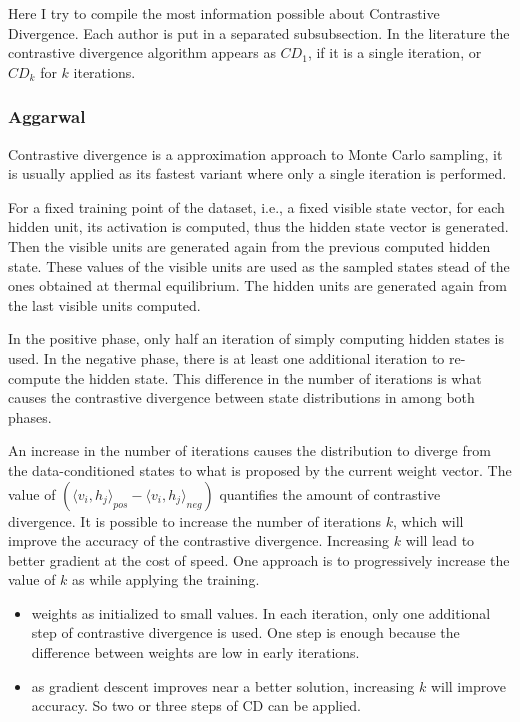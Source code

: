 Here I try to compile the most information possible about Contrastive Divergence.
Each author is put in a separated subsubsection.
In the literature the contrastive divergence algorithm appears as $CD_{1}$, if it is a single iteration, or $CD_{k}$ for $k$ iterations.

\subsubsection{Aggarwal}

Contrastive divergence is a approximation approach to Monte Carlo sampling, it is usually applied as its fastest variant where only a single iteration is performed.

For a fixed training point of the dataset, i.e., a fixed visible state vector, for each hidden unit, its activation is computed, thus the hidden state vector is generated.
Then the visible units are generated again from the previous computed hidden state.
These values of the visible units are used as the sampled states stead of the ones obtained at thermal equilibrium. 
The hidden units are generated again from the last visible units computed. 

In the positive phase, only half an iteration of simply computing hidden states is used.
In the negative phase, there is at least one additional iteration to re-compute the hidden state.
This difference in the number of iterations is what causes the contrastive divergence between state distributions in among both phases.

An increase in the number of iterations causes the distribution to diverge from the data-conditioned states to what is proposed by the current weight vector. 
The value of $({\langle v_{i}, h_{j} \rangle}_{pos} - {\langle v_{i}, h_{j} \rangle}_{neg})$ quantifies the amount of contrastive divergence.
It is possible to increase the number of iterations $k$, which will improve the accuracy of the contrastive divergence.
Increasing $k$ will lead to better gradient at the cost of speed.
One approach is to progressively increase the value of $k$ as while applying the training.
\begin{itemize}
    \item weights as initialized to small values. In each iteration, only one additional step of contrastive divergence is used. One step is enough because the difference between weights are low in early iterations.
    \item as gradient descent improves near a better solution, increasing $k$ will improve accuracy. So two or three steps of CD can be applied. 
\end{itemize}



